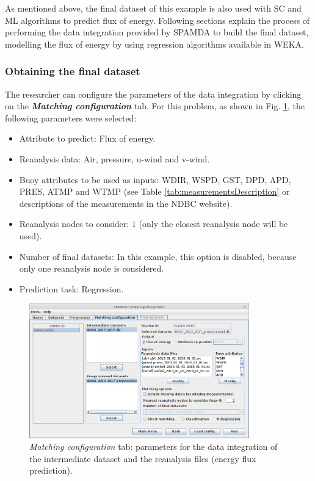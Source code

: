 \documentclass[energies,article,submit,moreauthors,pdftex]{Definitions/mdpi}
\begin{document}
			As mentioned above, the final dataset of this example is also used with SC and ML algorithms to predict flux of energy. Following sections explain the process of performing the data integration provided by SPAMDA to build the final dataset, modelling the flux of energy by using regression algorithms available in WEKA.
			
			\subsubsection{Obtaining the final dataset}
			
			The researcher can configure the parameters of the data integration by clicking on the \textbf{\textit{Matching configuration}} tab. For this problem, as shown in Fig. \ref{fig:matching_conf_ef}, the following parameters were selected:

			\begin{itemize}
				\item Attribute to predict: Flux of energy.
				\item Reanalysis data: Air, pressure, u-wind and v-wind.
				\item Buoy attributes to be used as inputs: WDIR, WSPD, GST, DPD, APD, PRES, ATMP and WTMP (see Table \ref{tab:measurementsDescription} or descriptions of the measurements in the NDBC website).
				\item Reanalysis nodes to consider: $1$ (only the closest reanalysis node will be used).
				\item Number of final datasets: In this example, this option is disabled, because only one reanalysis node is considered.
				\item Prediction task: Regression.
			\end{itemize} 
			
			\begin{figure}[ht!]
				\centering
				\includegraphics[width=0.85\textwidth]{figures/FigureMatching_configuration_EF.png}
				\caption{\textit{Matching configuration} tab: parameters for the data integration of the intermediate dataset and the reanalysis files (energy flux prediction).}\label{fig:matching_conf_ef}
			\end{figure}
\end{document}
